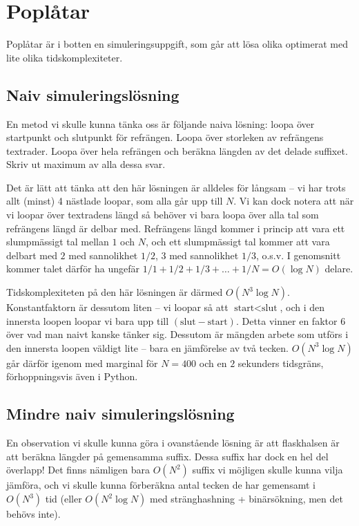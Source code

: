 \section{Poplåtar}
Poplåtar är i botten en simuleringsuppgift, som går att lösa olika optimerat med lite olika tidskomplexiteter.

\subsection*{Naiv simuleringslösning}
En metod vi skulle kunna tänka oss är följande naiva lösning:
loopa över startpunkt och slutpunkt för refrängen.
Loopa över storleken av refrängens textrader.
Loopa över hela refrängen och beräkna längden av det delade suffixet.
Skriv ut maximum av alla dessa svar.

Det är lätt att tänka att den här lösningen är alldeles för långsam -- vi har trots allt (minst) 4 nästlade loopar, som alla går upp till $N$.
Vi kan dock notera att när vi loopar över textradens längd så behöver vi bara loopa över alla tal som refrängens längd är delbar med.
Refrängens längd kommer i princip att vara ett slumpmässigt tal mellan $1$ och $N$, och
ett slumpmässigt tal kommer att vara delbart med $2$ med sannolikhet $1/2$, $3$ med sannolikhet $1/3$, o.s.v.
I genomsnitt kommer talet därför ha ungefär $1/1 + 1/2 + 1/3 + \dots + 1/N = O(\log N)$ delare.

Tidskomplexiteten på den här lösningen är därmed $O(N^3 \log N)$.
Konstantfaktorn är dessutom liten -- vi loopar så att $\text{start} < \text{slut}$, och i den innersta loopen loopar vi bara upp till $(\text{slut} - \text{start})$.
Detta vinner en faktor $6$ över vad man naivt kanske tänker sig.
Dessutom är mängden arbete som utförs i den innersta loopen väldigt lite -- bara en jämförelse av två tecken.
$O(N^3 \log N)$ går därför igenom med marginal för $N = 400$ och en $2$ sekunders tidsgräns, förhoppningsvis även i Python.

\subsection*{Mindre naiv simuleringslösning}
En observation vi skulle kunna göra i ovanstående lösning är att flaskhalsen är att beräkna längder på gemensamma suffix.
Dessa suffix har dock en hel del överlapp!
Det finns nämligen bara $O(N^2)$ suffix vi möjligen skulle kunna vilja jämföra, och
vi skulle kunna förberäkna antal tecken de har gemensamt i $O(N^3)$ tid (eller $O(N^2 \log N)$ med stränghashning + binärsökning, men det behövs inte).

